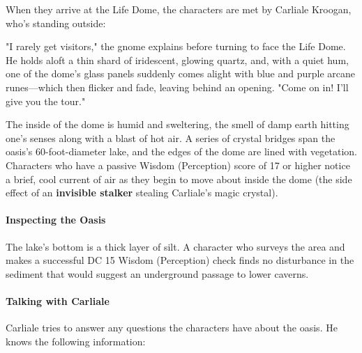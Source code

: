 \documentclass[letterpaper, 11pt, bg=full, twocolumn]{dndbook}
\begin{document}
When they arrive at the Life Dome, the characters are met by Carliale Kroogan, who's standing outside:

\begin{DndReadAloud}
"I rarely get visitors," the gnome explains before turning to face the Life Dome. He holds aloft a thin shard of iridescent, glowing quartz, and, with a quiet hum, one of the dome's glass panels suddenly comes alight with blue and purple arcane runes---which then flicker and fade, leaving behind an opening. "Come on in! I'll give you the tour."
\end{DndReadAloud}

The inside of the dome is humid and sweltering, the smell of damp earth hitting one's senses along with a blast of hot air. A series of crystal bridges span the oasis's 60-foot-diameter lake, and the edges of the dome are lined with vegetation. Characters who have a passive Wisdom (Perception) score of 17 or higher notice a brief, cool current of air as they begin to move about inside the dome (the side effect of an \textbf{invisible stalker} stealing Carliale's magic crystal).

\paragraph{Inspecting the Oasis}

The lake's bottom is a thick layer of silt. A character who surveys the area and makes a successful DC 15 Wisdom (Perception) check finds no disturbance in the sediment that would suggest an underground passage to lower caverns.

\paragraph{Talking with Carliale}

Carliale tries to answer any questions the characters have about the oasis. He knows the following information:
\end{document}
